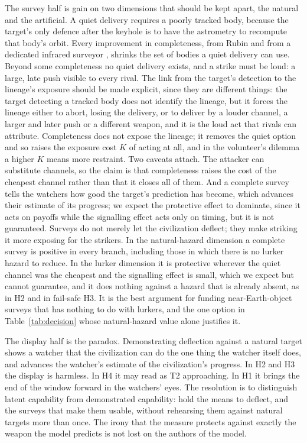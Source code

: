 \documentclass[preprint,12pt]{elsarticle}
\theoremstyle{definition}
\begin{document}
The survey half is gain on two dimensions that should be kept apart, the natural and the artificial. A quiet delivery requires a poorly tracked body, because the target's only defence after the keyhole is to have the astrometry to recompute that body's orbit. Every improvement in completeness, from Rubin and from a dedicated infrared surveyor \citep{Jones2018,Mainzer2023}, shrinks the set of bodies a quiet delivery can use. Beyond some completeness no quiet delivery exists, and a strike must be loud: a large, late push visible to every rival. The link from the target's detection to the lineage's exposure should be made explicit, since they are different things: the target detecting a tracked body does not identify the lineage, but it forces the lineage either to abort, losing the delivery, or to deliver by a louder channel, a larger and later push or a different weapon, and it is the loud act that rivals can attribute. Completeness does not expose the lineage; it removes the quiet option and so raises the exposure cost $K$ of acting at all, and in the volunteer's dilemma a higher $K$ means more restraint. Two caveats attach. The attacker can substitute channels, so the claim is that completeness raises the cost of the cheapest channel rather than that it closes all of them. And a complete survey tells the watchers how good the target's prediction has become, which advances their estimate of its progress; we expect the protective effect to dominate, since it acts on payoffs while the signalling effect acts only on timing, but it is not guaranteed. Surveys do not merely let the civilization deflect; they make striking it more exposing for the strikers. In the natural-hazard dimension a complete survey is positive in every branch, including those in which there is no lurker hazard to reduce. In the lurker dimension it is protective wherever the quiet channel was the cheapest and the signalling effect is small, which we expect but cannot guarantee, and it does nothing against a hazard that is already absent, as in H2 and in fail-safe H3. It is the best argument for funding near-Earth-object surveys that has nothing to do with lurkers, and the one option in Table~\ref{tab:decision} whose natural-hazard value alone justifies it.

The display half is the paradox. Demonstrating deflection against a natural target shows a watcher that the civilization can do the one thing the watcher itself does, and advances the watcher's estimate of the civilization's progress. In H2 and H3 the display is harmless. In H4 it may read as T2 approaching. In H1 it brings the end of the window forward in the watchers' eyes. The resolution is to distinguish latent capability from demonstrated capability: hold the means to deflect, and the surveys that make them usable, without rehearsing them against natural targets more than once. The irony that the measure protects against exactly the weapon the model predicts is not lost on the authors of the model.
\end{document}
